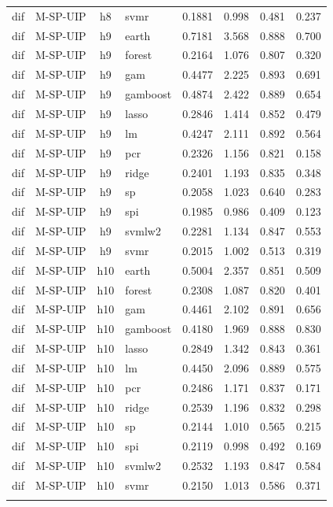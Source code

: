 \begin{ThreePartTable}
\begin{longtable}[t]{llclcccc}
dif & M-SP-UIP & h8 & svmr & 0.1881 & 0.998 & 0.481 & 0.237\\
\addlinespace
dif & M-SP-UIP & h9 & earth & 0.7181 & 3.568 & 0.888 & 0.700\\
dif & M-SP-UIP & h9 & forest & 0.2164 & 1.076 & 0.807 & 0.320\\
dif & M-SP-UIP & h9 & gam & 0.4477 & 2.225 & 0.893 & 0.691\\
dif & M-SP-UIP & h9 & gamboost & 0.4874 & 2.422 & 0.889 & 0.654\\
dif & M-SP-UIP & h9 & lasso & 0.2846 & 1.414 & 0.852 & 0.479\\
dif & M-SP-UIP & h9 & lm & 0.4247 & 2.111 & 0.892 & 0.564\\
dif & M-SP-UIP & h9 & pcr & 0.2326 & 1.156 & 0.821 & 0.158\\
dif & M-SP-UIP & h9 & ridge & 0.2401 & 1.193 & 0.835 & 0.348\\
dif & M-SP-UIP & h9 & sp & 0.2058 & 1.023 & 0.640 & 0.283\\
dif & M-SP-UIP & h9 & spi & 0.1985 & 0.986 & 0.409 & 0.123\\
dif & M-SP-UIP & h9 & svmlw2 & 0.2281 & 1.134 & 0.847 & 0.553\\
dif & M-SP-UIP & h9 & svmr & 0.2015 & 1.002 & 0.513 & 0.319\\
\addlinespace
dif & M-SP-UIP & h10 & earth & 0.5004 & 2.357 & 0.851 & 0.509\\
dif & M-SP-UIP & h10 & forest & 0.2308 & 1.087 & 0.820 & 0.401\\
dif & M-SP-UIP & h10 & gam & 0.4461 & 2.102 & 0.891 & 0.656\\
dif & M-SP-UIP & h10 & gamboost & 0.4180 & 1.969 & 0.888 & 0.830\\
dif & M-SP-UIP & h10 & lasso & 0.2849 & 1.342 & 0.843 & 0.361\\
dif & M-SP-UIP & h10 & lm & 0.4450 & 2.096 & 0.889 & 0.575\\
dif & M-SP-UIP & h10 & pcr & 0.2486 & 1.171 & 0.837 & 0.171\\
dif & M-SP-UIP & h10 & ridge & 0.2539 & 1.196 & 0.832 & 0.298\\
dif & M-SP-UIP & h10 & sp & 0.2144 & 1.010 & 0.565 & 0.215\\
dif & M-SP-UIP & h10 & spi & 0.2119 & 0.998 & 0.492 & 0.169\\
dif & M-SP-UIP & h10 & svmlw2 & 0.2532 & 1.193 & 0.847 & 0.584\\
dif & M-SP-UIP & h10 & svmr & 0.2150 & 1.013 & 0.586 & 0.371\\
\addlinespace

\end{longtable}
\end{ThreePartTable}
